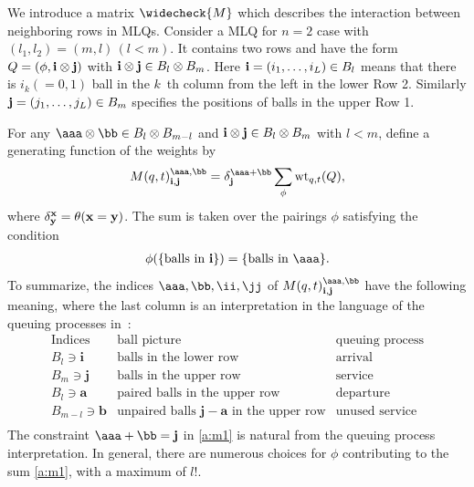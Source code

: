 We introduce a matrix $\widecheck{M}$ 
which describes the interaction between neighboring rows in MLQs. 
%
Consider a MLQ for $n=2$ case with $(l_1,l_2)=(m,l)\, (l<m)$.
It contains two rows and have the form
$Q=(\phi,{\bf i} \otimes {\bf j})$ with ${\bf i} \otimes {\bf j} \in B_l \otimes B_m$.
Here ${\bf i} =(i_1,\ldots, i_L) \in B_l$ 
means that there is $i_k(=0,1)$ ball in the $k$~th column from the left in the lower Row 2.
Similarly ${\bf j} = (j_1,\ldots, j_L) \in B_m$ specifies the positions of balls in the upper Row 1.

For any 
$\aaa \otimes \bb\in B_l \otimes B_{m-l}$ and 
${\bf i} \otimes {\bf j} \in B_l \otimes B_m$ with $l<m$, define 
a generating function of the weights by
\begin{equation}
M(q,t)^{\aaa, \bb}_{{\bf i}, {\bf j}}
= \delta^{\aaa+\bb}_{\bf j}\sum_{\phi} \text{wt}_{q,t}(Q),
\label{a:m1}
\end{equation}
where $\delta^{\bf x}_{\bf y} = \theta({\bf x}={\bf y})$.
The sum is taken over the pairings 
$\phi$ satisfying the condition
\begin{align}
\phi(\{\text{balls in ${\bf i}$}\}) = \{\text{balls in $\aaa$}\}.
\label{a:m2}
\end{align}
%
To summarize, the indices $\aaa, \bb,\ii,\jj$ of $M(q,t)^{\aaa, \bb}_{{\bf i}, {\bf j}}$ have the following meaning,
where the last column is an interpretation in the language of the queuing processes in~\cite{Martin20}:
\begin{equation}
\begin{array}{c|l|l}
\text{Indices} & \text{ball picture} & \text{queuing process} \\
\hline
B_l \ni \mathbf{i} & \text{balls in the lower row} & \text{arrival} \\
B_m \ni \mathbf{j} & \text{balls in the upper row} & \text{service} \\
B_l \ni \mathbf{a} & \text{paired balls in the upper row} & \text{departure} \\
B_{m-l} \ni \mathbf{b} & \text{unpaired balls } \mathbf{j}-\mathbf{a} \text{ in the upper row} & \text{unused service} \\
\end{array}
\label{a:abij}
\end{equation}
The constraint $\aaa + \bb={\bf j}$ in  \eqref{a:m1} is natural from the queuing process interpretation.
%
In general, there are numerous choices for $\phi$ contributing to the sum \eqref{a:m1}, with a maximum of $l!$.

